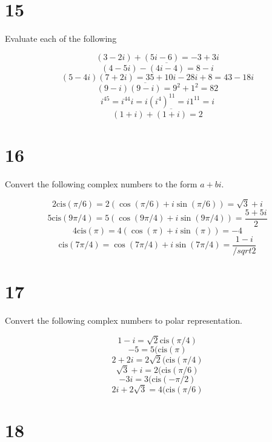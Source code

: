 \documentclass[a4paper]{article}
\begin{document}
\section*{15}

Evaluate each of the following

$$(3-2i) + (5i-6) = -3 + 3i$$
$$(4-5i) - \overline{(4i-4)} = 8 - i$$
$$(5-4i)(7+2i) = 35 + 10i - 28i + 8 = 43 - 18i$$
$$(9-i)\overline{(9-i)} = 9^2 + 1^2 = 82$$
$$i^{45} = i^{44} i = i(i^4)^{11} = i 1^{11} = i$$
$$(1+i) + \overline{(1+i)} = 2$$


\section*{16}

Convert the following complex numbers to the form $a + bi$. 

$$2 \text{cis} (\pi/6) = 2(\cos (\pi/6) + i \sin(\pi/6)) = \sqrt{3} + i$$
$$5 \text{cis} (9\pi/4) = 5(\cos (9\pi/4) + i \sin(9\pi/4)) = \frac{5 + 5i}{2}$$
$$4 \text{cis} (\pi) = 4(\cos (\pi) + i \sin(\pi)) = -4$$
$$\text{cis} (7\pi/4) = \cos (7\pi/4) + i \sin(7\pi/4) = \frac{1-i}{/sqrt{2}}$$


\section*{17}

Convert the following complex numbers to polar representation.

$$ 1-i = \sqrt{2} \text{cis}(\pi/4)$$
$$ -5 = 5(\text{cis}(\pi)$$
$$ 2 + 2i = 2\sqrt{2}(\text{cis}(\pi/4)$$
$$ \sqrt{3} + i = 2(\text{cis}(\pi/6)$$
$$ -3i = 3(\text{cis}(-\pi/2)$$
$$ 2i + 2 \sqrt{3} = 4(\text{cis}(\pi/6)$$


\section*{18}
\end{document}
